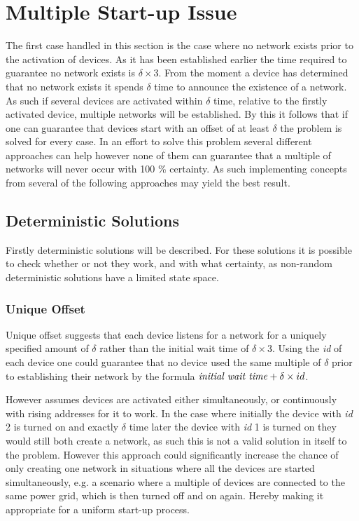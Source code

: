 \section{Multiple Start-up Issue}\label{sec:MSI-CCRC}
The first case handled in this section is the case where no network exists prior to the activation of devices.
As it has been established earlier the time required to guarantee no network exists is $\delta \times 3$.
From the moment a device has determined that no network exists it spends $\delta$ time to announce the existence of a network.
As such if several devices are activated within $\delta$ time, relative to the firstly activated device, multiple networks will be established.
By this it follows that if one can guarantee that devices start with an offset of at least $\delta$ the problem is solved for every case.
In an effort to solve this problem several different approaches can help however none of them can guarantee that a multiple of networks will never occur with 100 \% certainty. 
As such implementing concepts from several of the following approaches may yield the best result.

\subsection{Deterministic Solutions}
Firstly deterministic solutions will be described.
For these solutions it is possible to check whether or not they work, and with what certainty, as non-random deterministic solutions have a limited state space.

\subsubsection{Unique Offset}
Unique offset suggests that each device listens for a network for a uniquely specified amount of $\delta$ rather than the initial wait time of $\delta \times 3$.
Using the \textit{id} of each device one could guarantee that no device used the same multiple of $\delta$ prior to establishing their network by the formula $\text{\textit{initial wait time}} + \delta \times id$.

However assumes devices are activated either simultaneously, or continuously with rising addresses for it to work.
In the case where initially the device with \textit{id} 2 is turned on and exactly $\delta$ time later the device with \textit{id} 1 is turned on they would still both create a network, as such this is not a valid solution in itself to the problem.
However this approach could significantly increase the chance of only creating one network in situations where all the devices are started simultaneously, e.g. a scenario where a multiple of devices are connected to the same power grid, which is then turned off and on again.
Hereby making it appropriate for a uniform start-up process.

